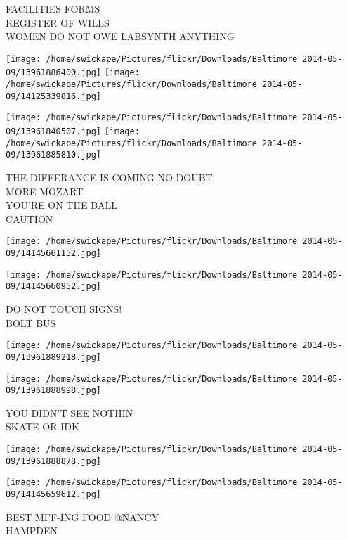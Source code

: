 \documentclass[10pt,letterpaper]{article}
\begin{document}
FACILITIES FORMS\\
REGISTER OF WILLS\\
WOMEN DO NOT OWE LABSYNTH ANYTHING\\
\pagebreak

\texttt{[image: /home/swickape/Pictures/flickr/Downloads/Baltimore 2014-05-09/13961886400.jpg]}
\texttt{[image: /home/swickape/Pictures/flickr/Downloads/Baltimore 2014-05-09/14125339816.jpg]}

\texttt{[image: /home/swickape/Pictures/flickr/Downloads/Baltimore 2014-05-09/13961840507.jpg]}
\texttt{[image: /home/swickape/Pictures/flickr/Downloads/Baltimore 2014-05-09/13961885810.jpg]}

THE DIFFERANCE IS COMING NO DOUBT\\
MORE MOZART\\
YOU'RE ON THE BALL\\
CAUTION\\
\pagebreak

\texttt{[image: /home/swickape/Pictures/flickr/Downloads/Baltimore 2014-05-09/14145661152.jpg]}

\vspace{0.25in}
\texttt{[image: /home/swickape/Pictures/flickr/Downloads/Baltimore 2014-05-09/14145660952.jpg]}

DO NOT TOUCH SIGNS!\\
BOLT BUS\\
\pagebreak

\texttt{[image: /home/swickape/Pictures/flickr/Downloads/Baltimore 2014-05-09/13961889218.jpg]}

\vspace{0.25in}
\texttt{[image: /home/swickape/Pictures/flickr/Downloads/Baltimore 2014-05-09/13961888998.jpg]}

YOU DIDN'T SEE NOTHIN\\
SKATE OR IDK\\
\pagebreak

\texttt{[image: /home/swickape/Pictures/flickr/Downloads/Baltimore 2014-05-09/13961888878.jpg]}

\vspace{0.25in}
\texttt{[image: /home/swickape/Pictures/flickr/Downloads/Baltimore 2014-05-09/14145659612.jpg]}

BEST MFF{-}ING FOOD @NANCY\\
HAMPDEN\\
\pagebreak
\end{document}
